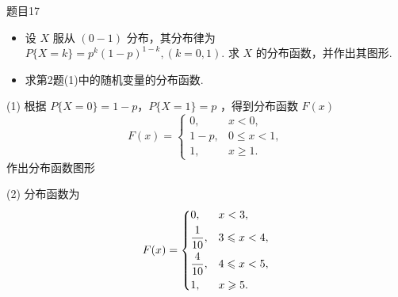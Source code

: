 \begin{question}{题目17}
    \begin{itemize}
        \item [(1)] 设 $X$ 服从 $(0-1)$ 分布，其分布律为 $P\{X=k\} = p^k(1-p)^{1-k},(k=0,1)$. 求 $X$ 的分布函数，并作出其图形.
        \item [(2)] 求第2题(1)中的随机变量的分布函数.
    \end{itemize}
\end{question}
\begin{solution}
    (1) 根据 $P\{X=0\} = 1-p$，$P\{X=1\} = p$ ，得到分布函数 $F(x)$
    $$
        F(x) = \begin{cases}
            0,   & x <0,              \\
            1-p, & 0 \leqslant x < 1, \\
            1,   & x \geqslant 1.
        \end{cases}
    $$
    作出分布函数图形
    \begin{center}
    \end{center}
    (2) 分布函数为
    $$
        F(x) = \begin{dcases}
            0,            & x < 3,             \\
            \frac{1}{10}, & 3 \leqslant x < 4, \\
            \frac{4}{10}, & 4 \leqslant x < 5, \\
            1,            & x \geqslant 5 .
        \end{dcases}
    $$
\end{solution}

